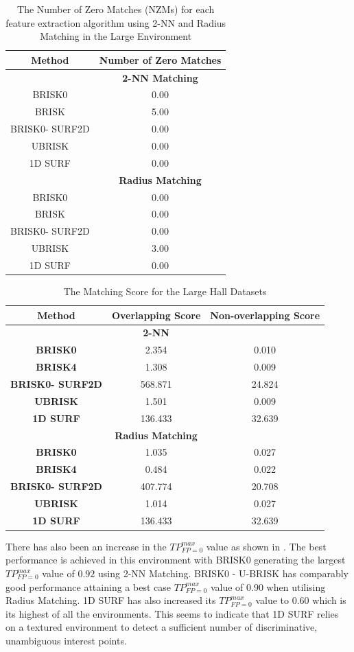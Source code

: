 \documentclass[11pt]{report}
\begin{document}
\begin{table}
\caption{The Number of Zero Matches (NZMs) for each feature extraction algorithm
using 2-NN and Radius Matching in the Large Environment}
\begin{tabular}{|c|c|}
\hline 
\textbf{Method} & \textbf{Number of Zero Matches}\tabularnewline
\hline 
 & \textbf{2-NN Matching}\tabularnewline
\hline 
\hline 
BRISK0 & 0.00\tabularnewline
\hline 
BRISK & 5.00\tabularnewline
\hline 
BRISK0- SURF2D & 0.00\tabularnewline
\hline 
UBRISK & 0.00\tabularnewline
\hline 
1D SURF & 0.00\tabularnewline
\hline 
 & \textbf{Radius Matching}\tabularnewline
\hline 
BRISK0 & 0.00\tabularnewline
\hline 
BRISK & 0.00\tabularnewline
\hline 
BRISK0- SURF2D & 0.00\tabularnewline
\hline 
UBRISK & 3.00\tabularnewline
\hline 
1D SURF & 0.00\tabularnewline
\hline 
\end{tabular}
\label{tab:lh_izm}
\end{table}

\begin{table}
\caption{The Matching Score for the Large Hall Datasets}
\begin{tabular}{|c|c|c|}
\hline 
\textbf{Method} & \textbf{Overlapping Score} & \textbf{Non-overlapping Score}\tabularnewline
\hline 
\hline 
 & \textbf{2-NN} & \tabularnewline
\hline 
\textbf{BRISK0} & 2.354 & 0.010\tabularnewline
\hline 
\textbf{BRISK4} & 1.308 & 0.009\tabularnewline
\hline 
\textbf{BRISK0- SURF2D} & 568.871 & 24.824\tabularnewline
\hline 
\textbf{UBRISK} & 1.501 & 0.009\tabularnewline
\hline 
\textbf{1D SURF} & 136.433 & 32.639\tabularnewline
\hline 
 & \textbf{Radius Matching} & \tabularnewline
\hline 
\textbf{BRISK0} & 1.035 & 0.027\tabularnewline
\hline 
\textbf{BRISK4} & 0.484 & 0.022\tabularnewline
\hline 
\textbf{BRISK0- SURF2D} & 407.774 & 20.708\tabularnewline
\hline 
\textbf{UBRISK} & 1.014 & 0.027\tabularnewline
\hline 
\textbf{1D SURF} & 136.433 & 32.639\tabularnewline
\hline 
\end{tabular}
\label{tab:lhMS}
\end{table}


There has also been an increase in the $TP_{FP=0}^{max}$ value as shown in . The best performance is achieved in this environment with BRISK0 generating the largest $TP_{FP=0}^{max}$ value of $0.92$ using 2-NN Matching. BRISK0 - U-BRISK has comparably good performance attaining a best case $TP_{FP=0}^{max}$ value of $0.90$ when utilising Radius Matching. 1D SURF has also increased its $TP_{FP=0}^{max}$ value to $0.60$ which is its highest of all the environments. This seems to indicate that 1D SURF relies on a textured environment to detect a sufficient number of discriminative, unambiguous interest points.\\
\end{document}
